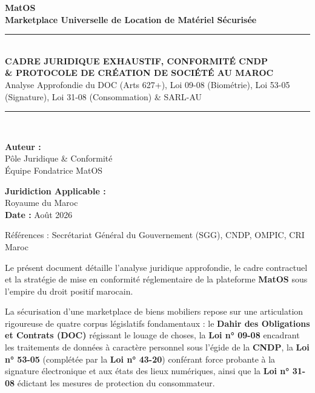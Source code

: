 \documentclass[11pt,a4paper]{report}
\begin{document}
\begin{titlepage}
    \centering
    \vspace*{1.5cm}
    {\Huge\bfseries\color{primaryNavy} MatOS}\\[0.4cm]
    {\LARGE\bfseries\color{accentTeal} Marketplace Universelle de Location de Matériel Sécurisée}\\[1.5cm]
    
    \rule{\linewidth}{1.8pt}\\[0.4cm]
    {\huge\bfseries CADRE JURIDIQUE EXHAUSTIF, CONFORMITÉ CNDP\\\& PROTOCOLE DE CRÉATION DE SOCIÉTÉ AU MAROC}\\[0.3cm]
    {\large Analyse Approfondie du DOC (Arts 627+), Loi 09-08 (Biométrie), Loi 53-05 (Signature), Loi 31-08 (Consommation) \& SARL-AU}\\[0.4cm]
    \rule{\linewidth}{1.8pt}\\[2.2cm]
    
    \begin{minipage}{0.45\textwidth}
        \begin{flushleft} \large
            \textbf{Auteur :}\\
            Pôle Juridique \& Conformité\\
            Équipe Fondatrice MatOS
        \end{flushleft}
    \end{minipage}
    \hfill
    \begin{minipage}{0.45\textwidth}
        \begin{flushright} \large
            \textbf{Juridiction Applicable :}\\
            Royaume du Maroc\\
            \textbf{Date :} Août 2026
        \end{flushright}
    \end{minipage}
    
    \vfill
    {\small Références : Secrétariat Général du Gouvernement (SGG), CNDP, OMPIC, CRI Maroc}
\end{titlepage}

\tableofcontents
\newpage

\begin{tcolorbox}[execbox]
Le présent document détaille l'analyse juridique approfondie, le cadre contractuel et la stratégie de mise en conformité réglementaire de la plateforme \textbf{MatOS} sous l'empire du droit positif marocain.

La sécurisation d'une marketplace de biens mobiliers repose sur une articulation rigoureuse de quatre corpus législatifs fondamentaux : le \textbf{Dahir des Obligations et Contrats (DOC)} régissant le louage de choses, la \textbf{Loi n° 09-08} encadrant les traitements de données à caractère personnel sous l'égide de la \textbf{CNDP}, la \textbf{Loi n° 53-05} (complétée par la \textbf{Loi n° 43-20}) conférant force probante à la signature électronique et aux états des lieux numériques, ainsi que la \textbf{Loi n° 31-08} édictant les mesures de protection du consommateur.
\end{tcolorbox}
\end{document}
